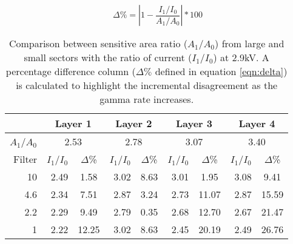 \begin{equation}\label{eqn:delta}
	\Delta\%=\left|1-\frac{I_1/I_0}{A_1/A_0}\right|*100
\end{equation}


\begin{table}[ht]\footnotesize
	\centering
	\begin{tabular*}{0.7\textwidth}{rrcrcrcrc}
	 & \multicolumn{2}{c}{Layer 1} &\multicolumn{2}{c}{ Layer 2} &\multicolumn{2}{c}{ Layer 3
	}&\multicolumn{2}{c}{Layer 4}\\
	\hline
	$A_1$/$A_0$&\multicolumn{2}{c}{2.53}&\multicolumn{2}{c}{2.78}&\multicolumn{2}{c}{3.07}&\multicolumn{2}{c}{3.40}\\
	Filter & $I_1$/$I_0$ & $\Delta$\%& $I_1$/$I_0$ & $\Delta$\%& $I_1$/$I_0$ &$\Delta$\%& $I_1$/$I_0$ & $\Delta$\%\\ 	
	\hline
	10 	&2.49 &1.58  	&3.02 &8.63		&3.01 &1.95 	&3.08	&9.41 \\
	4.6 &2.34	&7.51 	&2.87 &3.24		&2.73 &11.07 	&2.87	&15.59\\
	2.2	&2.29 &9.49 	&2.79 &0.35		&2.68 &12.70 	&2.67	&21.47\\
	1		&2.22 &12.25 	&3.02 &8.63 	&2.45 &20.19 	&2.49	&26.76\\
	\hline
	\end{tabular*}
	\caption{Comparison between sensitive area ratio ($A_1$/$A_0$) from large and small sectors with the ratio of current
	($I_1$/$I_0$) at 2.9kV. A percentage difference column ($\Delta \%$ defined in equation \ref{eqn:delta}) is calculated to
	highlight the incremental disagreement as the gamma rate increases.}\label{aratio}
\end{table}
